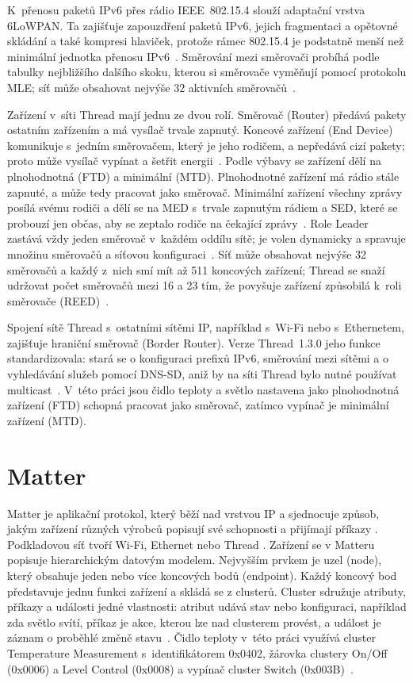 K~přenosu paketů IPv6 přes rádio IEEE~802.15.4 slouží adaptační vrstva
6LoWPAN. Ta zajišťuje zapouzdření paketů IPv6, jejich fragmentaci a opětovné
skládání a také kompresi hlaviček, protože rámec 802.15.4 je podstatně menší
než minimální jednotka přenosu IPv6~\cite{thread-6lowpan}. Směrování mezi
směrovači probíhá podle tabulky nejbližšího dalšího skoku, kterou si směrovače
vyměňují pomocí protokolu MLE; síť může obsahovat nejvýše 32 aktivních
směrovačů~\cite{silabs-thread}.

Zařízení v~síti Thread mají jednu ze dvou rolí. Směrovač (Router) předává
pakety ostatním zařízením a má vysílač trvale zapnutý. Koncové zařízení
(End Device) komunikuje s~jedním směrovačem, který je jeho rodičem, a nepředává
cizí pakety; proto může vysílač vypínat a šetřit energii~\cite{openthread-roles}.
Podle výbavy se zařízení dělí na plnohodnotná (FTD) a minimální (MTD).
Plnohodnotné zařízení má rádio stále zapnuté, a může tedy pracovat jako
směrovač. Minimální zařízení všechny zprávy posílá svému rodiči a dělí se
na MED s~trvale zapnutým rádiem a SED, které se probouzí jen občas, aby se
zeptalo rodiče na čekající zprávy~\cite{openthread-roles}. Role Leader
zastává vždy jeden směrovač v~každém oddílu sítě; je volen dynamicky
a spravuje množinu směrovačů a síťovou konfiguraci~\cite{openthread-roles}.
Síť může obsahovat nejvýše 32 směrovačů a každý z~nich smí mít až
511 koncových zařízení; Thread se snaží udržovat počet směrovačů mezi 16 a 23
tím, že povyšuje zařízení způsobilá k~roli směrovače (REED)~\cite{openthread-roles}.

Spojení sítě Thread s~ostatními sítěmi IP, například s~Wi-Fi nebo
s~Ethernetem, zajišťuje hraniční směrovač (Border Router). Verze Thread~1.3.0
jeho funkce standardizovala: stará se o konfiguraci prefixů IPv6, směrování
mezi sítěmi a o vyhledávání služeb pomocí DNS-SD, aniž by na síti Thread bylo
nutné používat multicast~\cite{thread-group}. V~této práci jsou čidlo teploty
a světlo nastavena jako plnohodnotná zařízení (FTD) schopná pracovat
jako směrovač, zatímco vypínač je minimální zařízení (MTD).


\section{Matter}
Matter je aplikační protokol, který běží nad vrstvou IP a sjednocuje způsob,
jakým zařízení různých výrobců popisují své schopnosti a přijímají příkazy
\cite{csa-matter}. Podkladovou síť tvoří Wi-Fi, Ethernet nebo Thread
\cite{csa-matter-arrives}. Zařízení se v Matteru popisuje hierarchickým
datovým modelem. Nejvyšším prvkem je uzel (node), který obsahuje jeden nebo
více koncových bodů (endpoint). Každý koncový bod představuje jednu funkci
zařízení a skládá se z clusterů. Cluster sdružuje atributy, příkazy a události
jedné vlastnosti: atribut udává stav nebo konfiguraci, například zda světlo
svítí, příkaz je akce, kterou lze nad clusterem provést, a událost je záznam
o proběhlé změně stavu~\cite{silabs-matter-datamodel}. Čidlo teploty v~této
práci využívá cluster Temperature Measurement s~identifikátorem 0x0402,
žárovka clustery On/Off (0x0006) a Level Control (0x0008) a vypínač cluster
Switch (0x003B)~\cite{csa-matter}.


